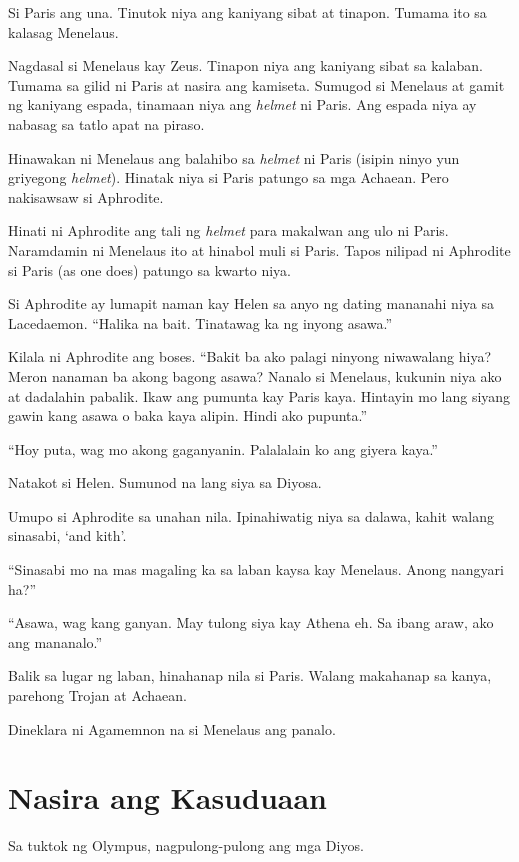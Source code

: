 \documentclass[12pt,letterpaper]{report}
\begin{document}
Si Paris ang una. Tinutok niya ang kaniyang sibat at tinapon. Tumama ito sa kalasag Menelaus.

Nagdasal si Menelaus kay Zeus. Tinapon niya ang kaniyang sibat sa kalaban. Tumama sa gilid ni Paris at nasira ang kamiseta. Sumugod si Menelaus at gamit ng kaniyang espada, tinamaan niya ang \textit{helmet} ni Paris. Ang espada niya ay nabasag sa tatlo apat na piraso.

Hinawakan ni Menelaus ang balahibo sa \textit{helmet} ni Paris (isipin ninyo yun griyegong \textit{helmet}). Hinatak niya si Paris patungo sa mga Achaean. Pero nakisawsaw si Aphrodite.

Hinati ni Aphrodite ang tali ng \textit{helmet} para makalwan ang ulo ni Paris. Naramdamin ni Menelaus ito at hinabol muli si Paris. Tapos nilipad ni Aphrodite si Paris (as one does) patungo sa kwarto niya.

Si Aphrodite ay lumapit naman kay Helen sa anyo ng dating mananahi niya sa Lacedaemon. ``Halika na bait. Tinatawag ka ng inyong asawa.''

Kilala ni Aphrodite ang boses. ``Bakit ba ako palagi ninyong niwawalang hiya? Meron nanaman ba akong bagong asawa? Nanalo si Menelaus, kukunin niya ako at dadalahin pabalik. Ikaw ang pumunta kay Paris kaya. Hintayin mo lang siyang gawin kang asawa o baka kaya alipin. Hindi ako pupunta.''

``Hoy puta, wag mo akong gaganyanin. Palalalain ko ang giyera kaya.''

Natakot si Helen. Sumunod na lang siya sa Diyosa.

Umupo si Aphrodite sa unahan nila. Ipinahiwatig niya sa dalawa, kahit walang sinasabi, `and kith'.

``Sinasabi mo na mas magaling ka sa laban kaysa kay Menelaus. Anong nangyari ha?''

``Asawa, wag kang ganyan. May tulong siya kay Athena eh. Sa ibang araw, ako ang mananalo.''

Balik sa lugar ng laban, hinahanap nila si Paris. Walang makahanap sa kanya, parehong Trojan at Achaean.

Dineklara ni Agamemnon na si Menelaus ang panalo.


\pagebreak
\chapter{Nasira ang Kasuduaan}

Sa tuktok ng Olympus, nagpulong-pulong ang mga Diyos.
\end{document}
